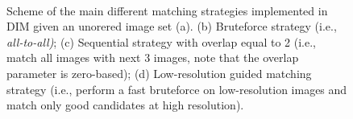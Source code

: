 \begin{figure}[ht]
  \centering
   \qquad
  \\ \vspace{2mm}
  \qquad
  \caption{Scheme of the main different matching strategies implemented in DIM given an unorered image set (a). (b) Bruteforce strategy (i.e., \textit{all-to-all)}; (c) Sequential strategy with overlap equal to 2 (i.e., match all images with next 3 images, note that the overlap parameter is zero-based); (d) Low-resolution guided matching strategy (i.e., perform a fast bruteforce on low-resolution images and match only good candidates at high resolution).}
  \label{fig:5:matching_strategy}
\end{figure}

